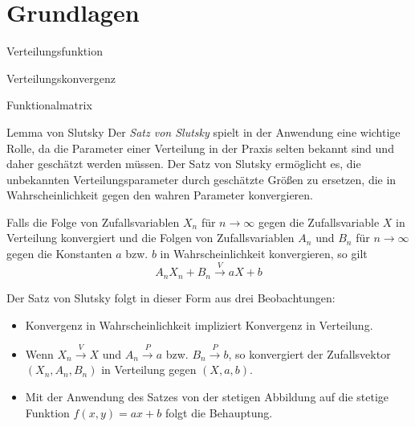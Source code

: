 \section*{Grundlagen}



\begin{bonus}{Verteilungsfunktion}

\end{bonus}

\begin{bonus}{Verteilungskonvergenz}

\end{bonus}

\begin{bonus}{Funktionalmatrix}

\end{bonus}

\begin{bonus}{Lemma von Slutsky}
    Der \emph{Satz von Slutsky} spielt in der Anwendung eine wichtige Rolle, da die Parameter einer Verteilung in der Praxis selten bekannt sind und daher geschätzt werden müssen. Der Satz von Slutsky ermöglicht es, die unbekannten Verteilungsparameter durch geschätzte Größen zu ersetzen, die in Wahrscheinlichkeit gegen den wahren Parameter konvergieren.

    Falls die Folge von Zufallsvariablen $X_n$ für $n \to \infty$ gegen die Zufallsvariable $X$ in Verteilung konvergiert und die Folgen von Zufallsvariablen $A_n$ und $B_n$ für $n \to \infty$ gegen die Konstanten $a$ bzw. $b$ in Wahrscheinlichkeit konvergieren, so gilt
    \[
        A_n X_n + B_n \xrightarrow{V} aX + b
    \]

    Der Satz von Slutsky folgt in dieser Form aus drei Beobachtungen:
    \begin{itemize}
        \item Konvergenz in Wahrscheinlichkeit impliziert Konvergenz in Verteilung.
        \item Wenn $X_n \xrightarrow{V} X$ und $A_n \xrightarrow{P} a$ bzw. $B_n \xrightarrow{P} b$, so konvergiert der Zufallsvektor $(X_n, A_n, B_n)$ in Verteilung gegen $(X, a, b)$.
        \item Mit der Anwendung des Satzes von der stetigen Abbildung auf die stetige Funktion $f(x, y) = ax + b$ folgt die Behauptung.
    \end{itemize}
\end{bonus}

